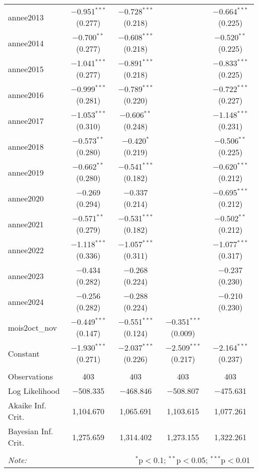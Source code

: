 \begin{table}[!htbp]
\begin{tabular}{@{\extracolsep{5pt}}lcccc}
  annee2013 & $-$0.951$^{***}$ (0.277) & $-$0.728$^{***}$ (0.218) &  & $-$0.664$^{***}$ (0.225) \\ 
  annee2014 & $-$0.700$^{**}$ (0.277) & $-$0.608$^{***}$ (0.218) &  & $-$0.520$^{**}$ (0.225) \\ 
  annee2015 & $-$1.041$^{***}$ (0.277) & $-$0.891$^{***}$ (0.218) &  & $-$0.833$^{***}$ (0.225) \\ 
  annee2016 & $-$0.999$^{***}$ (0.281) & $-$0.789$^{***}$ (0.220) &  & $-$0.722$^{***}$ (0.227) \\ 
  annee2017 & $-$1.053$^{***}$ (0.310) & $-$0.606$^{**}$ (0.248) &  & $-$1.148$^{***}$ (0.231) \\ 
  annee2018 & $-$0.573$^{**}$ (0.280) & $-$0.420$^{*}$ (0.219) &  & $-$0.506$^{**}$ (0.225) \\ 
  annee2019 & $-$0.662$^{**}$ (0.280) & $-$0.541$^{***}$ (0.182) &  & $-$0.620$^{***}$ (0.212) \\ 
  annee2020 & $-$0.269 (0.294) & $-$0.337 (0.214) &  & $-$0.695$^{***}$ (0.212) \\ 
  annee2021 & $-$0.571$^{**}$ (0.279) & $-$0.531$^{***}$ (0.182) &  & $-$0.502$^{**}$ (0.212) \\ 
  annee2022 & $-$1.118$^{***}$ (0.336) & $-$1.057$^{***}$ (0.311) &  & $-$1.077$^{***}$ (0.317) \\ 
  annee2023 & $-$0.434 (0.282) & $-$0.268 (0.224) &  & $-$0.237 (0.230) \\ 
  annee2024 & $-$0.256 (0.282) & $-$0.288 (0.224) &  & $-$0.210 (0.230) \\ 
  mois2oct\_nov & $-$0.449$^{***}$ (0.147) & $-$0.551$^{***}$ (0.124) & $-$0.351$^{***}$ (0.009) &  \\ 
  Constant & $-$1.930$^{***}$ (0.271) & $-$2.037$^{***}$ (0.226) & $-$2.509$^{***}$ (0.217) & $-$2.164$^{***}$ (0.237) \\ 
 \hline \\[-1.8ex] 
Observations & 403 & 403 & 403 & 403 \\ 
Log Likelihood & $-$508.335 & $-$468.846 & $-$508.807 & $-$475.631 \\ 
Akaike Inf. Crit. & 1,104.670 & 1,065.691 & 1,103.615 & 1,077.261 \\ 
Bayesian Inf. Crit. & 1,275.659 & 1,314.402 & 1,273.155 & 1,322.261 \\ 
\hline 
\hline \\[-1.8ex] 
\textit{Note:}  & \multicolumn{4}{r}{$^{*}$p$<$0.1; $^{**}$p$<$0.05; $^{***}$p$<$0.01} \\ 
\end{tabular} 
\end{table} 
